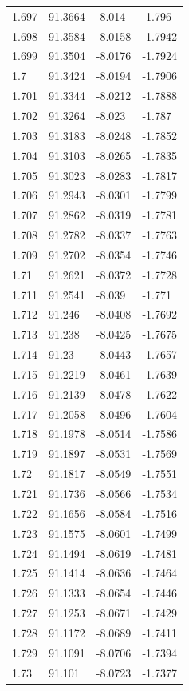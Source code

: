 \begin{tabular}{llll}
1.697 & 91.3664 & -8.014 & -1.796 \\
1.698 & 91.3584 & -8.0158 & -1.7942 \\
1.699 & 91.3504 & -8.0176 & -1.7924 \\
1.7 & 91.3424 & -8.0194 & -1.7906 \\
1.701 & 91.3344 & -8.0212 & -1.7888 \\
1.702 & 91.3264 & -8.023 & -1.787 \\
1.703 & 91.3183 & -8.0248 & -1.7852 \\
1.704 & 91.3103 & -8.0265 & -1.7835 \\
1.705 & 91.3023 & -8.0283 & -1.7817 \\
1.706 & 91.2943 & -8.0301 & -1.7799 \\
1.707 & 91.2862 & -8.0319 & -1.7781 \\
1.708 & 91.2782 & -8.0337 & -1.7763 \\
1.709 & 91.2702 & -8.0354 & -1.7746 \\
1.71 & 91.2621 & -8.0372 & -1.7728 \\
1.711 & 91.2541 & -8.039 & -1.771 \\
1.712 & 91.246 & -8.0408 & -1.7692 \\
1.713 & 91.238 & -8.0425 & -1.7675 \\
1.714 & 91.23 & -8.0443 & -1.7657 \\
1.715 & 91.2219 & -8.0461 & -1.7639 \\
1.716 & 91.2139 & -8.0478 & -1.7622 \\
1.717 & 91.2058 & -8.0496 & -1.7604 \\
1.718 & 91.1978 & -8.0514 & -1.7586 \\
1.719 & 91.1897 & -8.0531 & -1.7569 \\
1.72 & 91.1817 & -8.0549 & -1.7551 \\
1.721 & 91.1736 & -8.0566 & -1.7534 \\
1.722 & 91.1656 & -8.0584 & -1.7516 \\
1.723 & 91.1575 & -8.0601 & -1.7499 \\
1.724 & 91.1494 & -8.0619 & -1.7481 \\
1.725 & 91.1414 & -8.0636 & -1.7464 \\
1.726 & 91.1333 & -8.0654 & -1.7446 \\
1.727 & 91.1253 & -8.0671 & -1.7429 \\
1.728 & 91.1172 & -8.0689 & -1.7411 \\
1.729 & 91.1091 & -8.0706 & -1.7394 \\
1.73 & 91.101 & -8.0723 & -1.7377 \\

\end{tabular}
